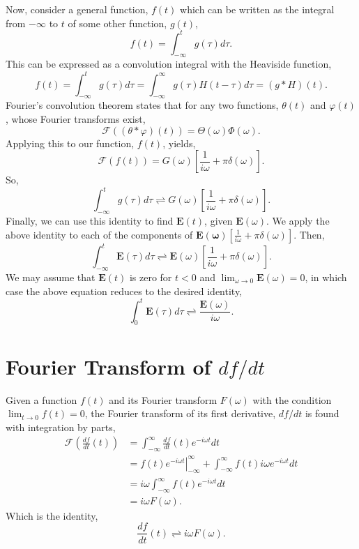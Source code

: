 \documentclass[12pt,twocolumn]{article}
\begin{document}
Now, consider a general function, $f(t)$ which can be written as the integral from $-\infty$ to $t$ of some other function, $g(t)$,
\begin{equation}
f(t)=\int_{-\infty}^{t}g(\tau)d\tau.
\end{equation}
This can be expressed as a convolution integral with the Heaviside function,
\begin{equation}
f(t)=\int_{-\infty}^{t}g(\tau)d\tau = \int_{-\infty}^{\infty}g(\tau)H(t-\tau)d\tau=(g*H)(t).
\end{equation}
Fourier's convolution theorem states that for any two functions, $\theta(t)$ and $\varphi(t)$, whose Fourier transforms exist,
\begin{equation}
\mathcal{F}((\theta*\varphi)(t)) = \Theta(\omega)\varPhi(\omega).
\end{equation}
Applying this to our function, $f(t)$, yields,
\begin{equation}
\mathcal{F}(f(t)) = G(\omega)\left[\frac{1}{i\omega}+\pi\delta(\omega)\right].
\end{equation}
So,
\begin{equation}
\int_{-\infty}^{t}g(\tau)d\tau\rightleftharpoons G(\omega)\left[\frac{1}{i\omega}+\pi\delta(\omega)\right].
\end{equation}
Finally, we can use this identity to find $\mathbf{E}(t)$, given $\mathbf{E}(\omega)$. We apply the above identity to each of the components of $\mathbf{E(\omega)}\left[\frac{1}{i\omega}+\pi\delta(\omega)\right]$. Then,
\begin{equation}
\int_{-\infty}^{t}\mathbf{E}(\tau)d\tau\rightleftharpoons \mathbf{E}(\omega)\left[\frac{1}{i\omega}+\pi\delta(\omega)\right].
\end{equation}
We may assume that $\mathbf{E}(t)$ is zero for $t<0$ and $\lim_{\omega\rightarrow 0}\mathbf{E}(\omega)=0$, in which case the above equation reduces to the desired identity,
\begin{equation}
\int_0^t\mathbf{E}(\tau)d\tau\rightleftharpoons \frac{\mathbf{E}(\omega)}{i\omega}.
\end{equation}
\newpage
\section{Fourier Transform of $df/dt$}
\label{ap:fourier2}
Given a function $f(t)$ and its Fourier transform $F(\omega)$ with the condition $\lim_{t\rightarrow 0}f(t) = 0$, the Fourier transform of its first derivative, $df/dt$ is found with integration by parts,
\begin{align*}
\mathcal{F}\left(\frac{df}{dt}(t)\right) &= \int_{-\infty}^{\infty}\frac{df}{dt}(t)e^{-i\omega t}dt \\
& = \left.f(t)e^{-i\omega t}\right|_{-\infty}^{\infty} + \int_{-\infty}^{\infty}f(t)i\omega e^{-i\omega t}dt\\
& = i\omega \int_{-\infty}^{\infty}f(t)e^{-i\omega t}dt\\
& = i\omega F(\omega).
\end{align*}
Which is the identity,
\begin{equation}
\frac{df}{dt}(t) \rightleftharpoons i\omega F(\omega).
\end{equation}
\end{document}
